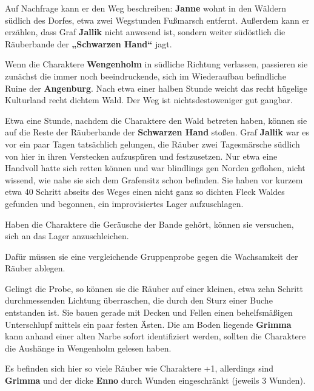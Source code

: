 Auf Nachfrage kann er den Weg beschreiben: \textbf{Janne} wohnt in den Wäldern südlich des Dorfes, etwa zwei Wegstunden Fußmarsch entfernt.
Außerdem kann er erzählen, dass Graf \textbf{Jallik} nicht anwesend ist, sondern weiter südöstlich die Räuberbande der \textbf{„Schwarzen Hand“} jagt.


Wenn die Charaktere \textbf{Wengenholm} in südliche Richtung verlassen, passieren sie zunächst die immer noch beeindruckende, sich im Wiederaufbau befindliche Ruine der \textbf{Angenburg}.
Nach etwa einer halben Stunde weicht das recht hügelige Kulturland recht dichtem Wald.
Der Weg ist nichtsdestoweniger gut gangbar.

Etwa eine Stunde, nachdem die Charaktere den Wald betreten haben, können sie auf die Reste der Räuberbande der \textbf{Schwarzen Hand} stoßen.
Graf \textbf{Jallik} war es vor ein paar Tagen tatsächlich gelungen, die Räuber zwei Tagesmärsche südlich von hier in ihren Verstecken aufzuspüren und festzusetzen.
Nur etwa eine Handvoll hatte sich retten können und war blindlings gen Norden geflohen, nicht wissend, wie nahe sie sich dem Grafensitz schon befinden.
Sie haben vor kurzem etwa 40 Schritt abseits des Weges einen nicht ganz so dichten Fleck Waldes gefunden und begonnen, ein improvisiertes Lager aufzuschlagen.


\neuespalte

Haben die Charaktere die Geräusche der Bande gehört, können sie versuchen, sich an das Lager anzuschleichen. 

{
Dafür müssen sie eine vergleichende Gruppenprobe %
gegen die Wachsamkeit  der Räuber %
ablegen.
}

Gelingt die Probe, so können sie die Räuber auf einer kleinen, etwa zehn Schritt durchmessenden Lichtung überraschen, die durch den Sturz einer Buche entstanden ist. Sie bauen gerade mit Decken und Fellen einen behelfsmäßigen Unterschlupf mittels ein paar festen Ästen. Die am Boden liegende \textbf{Grimma} kann anhand einer alten Narbe sofort identifiziert werden, sollten die Charaktere die Aushänge in Wengenholm gelesen haben.

Es befinden sich hier so viele Räuber wie Charaktere +1, allerdings sind \textbf{Grimma} und der dicke \textbf{Enno} durch Wunden eingeschränkt (jeweils 3 Wunden).

